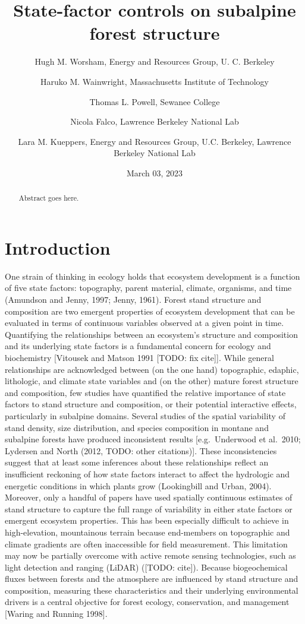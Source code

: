 \documentclass[
  12pt,
]{article}
\title{\textbf{State-factor controls on subalpine forest structure}}
\author{Hugh M. Worsham, Energy and Resources Group, U. C.
Berkeley \and Haruko M. Wainwright, Massachusetts Institute of
Technology \and Thomas L. Powell, Sewanee College \and Nicola Falco,
Lawrence Berkeley National Lab \and Lara M. Kueppers, Energy and
Resources Group, U.C. Berkeley, Lawrence Berkeley National Lab}
\date{March 03, 2023}
\begin{document}
\maketitle
\begin{abstract}
Abstract goes here.
\end{abstract}

\hypertarget{introduction}{%
\section{Introduction}\label{introduction}}

One strain of thinking in ecology holds that ecosystem development is a
function of five state factors: topography, parent material, climate,
organisms, and time (Amundson and Jenny, 1997; Jenny, 1961). Forest
stand structure and composition are two emergent properties of ecosystem
development that can be evaluated in terms of continuous variables
observed at a given point in time. Quantifying the relationships between
an ecosystem's structure and composition and its underlying state
factors is a fundamental concern for ecology and biochemistry
{[}Vitousek and Matson 1991 {[}TODO: fix cite{]}{]}. While general
relationships are acknowledged between (on the one hand) topographic,
edaphic, lithologic, and climate state variables and (on the other)
mature forest structure and composition, few studies have quantified the
relative importance of state factors to stand structure and composition,
or their potential interactive effects, particularly in subalpine
domains. Several studies of the spatial variability of stand density,
size distribution, and species composition in montane and subalpine
forests have produced inconsistent results {[}e.g.~Underwood et
al.~2010; Lydersen and North (2012, TODO: other citations){]}. These
inconsistencies suggest that at least some inferences about these
relationships reflect an insufficient reckoning of how state factors
interact to affect the hydrologic and energetic conditions in which
plants grow (Lookingbill and Urban, 2004). Moreover, only a handful of
papers have used spatially continuous estimates of stand structure to
capture the full range of variability in either state factors or
emergent ecosystem properties. This has been especially difficult to
achieve in high-elevation, mountainous terrain because end-members on
topographic and climate gradients are often inaccessible for field
measurement. This limitation may now be partially overcome with active
remote sensing technologies, such as light detection and ranging (LiDAR)
({[}TODO: cite{]}). Because biogeochemical fluxes between forests and
the atmosphere are influenced by stand structure and composition,
measuring these characteristics and their underlying environmental
drivers is a central objective for forest ecology, conservation, and
management {[}Waring and Running 1998{]}.
\end{document}
